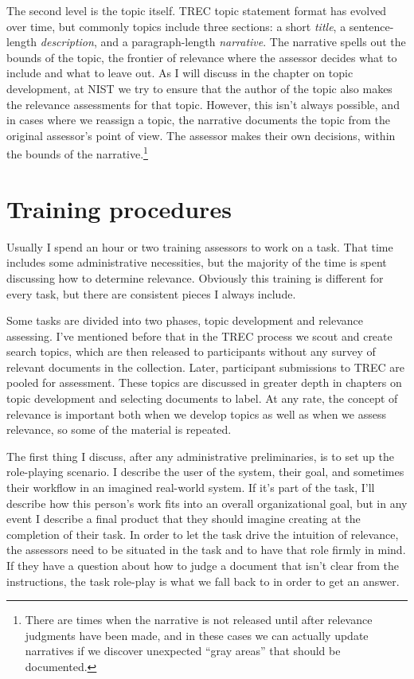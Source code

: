 \documentclass[nobib]{tufte-book}
\begin{document}
The second level is the topic itself.  TREC topic statement format has evolved over time, but commonly topics include three sections: a short {\em title}, a sentence-length {\em description}, and a paragraph-length {\em narrative}.  The narrative spells out the bounds of the topic, the frontier of relevance where the assessor decides what to include and what to leave out.  As I will discuss in the chapter on topic development, at NIST we try to ensure that the author of the topic also makes the relevance assessments for that topic.  However, this isn't always possible, and in cases where we reassign a topic, the narrative documents the topic from the original assessor's point of view.  The assessor makes their own decisions, within the bounds of the narrative.\footnote{There are times when the narrative is not released until after relevance judgments have been made, and in these cases we can actually update narratives if we discover unexpected ``gray areas'' that should be documented.}

\section{Training procedures}

Usually I spend an hour or two training assessors to work on a task.  That time includes some administrative necessities, but the majority of the time is spent discussing how to determine relevance.  Obviously this training is different for every task, but there are consistent pieces I always include.

Some tasks are divided into two phases, topic development and relevance assessing.  I've mentioned before that in the TREC process we scout and create search topics, which are then released to participants without any survey of relevant documents in the collection.  Later, participant submissions to TREC are pooled for assessment.  These topics are discussed in greater depth in chapters on topic development and selecting documents to label.  At any rate, the concept of relevance is important both when we develop topics as well as when we assess relevance, so some of the material is repeated.

The first thing I discuss, after any administrative preliminaries, is to set up the role-playing scenario.  I describe the user of the system, their goal, and sometimes their workflow in an imagined real-world system.  If it's part of the task, I'll describe how this person's work fits into an overall organizational goal, but in any event I describe a final product that they should imagine creating at the completion of their task.  In order to let the task drive the intuition of relevance, the assessors need to be situated in the task and to have that role firmly in mind.  If they have a question about how to judge a document that isn't clear from the instructions, the task role-play is what we fall back to in order to get an answer.
\end{document}
